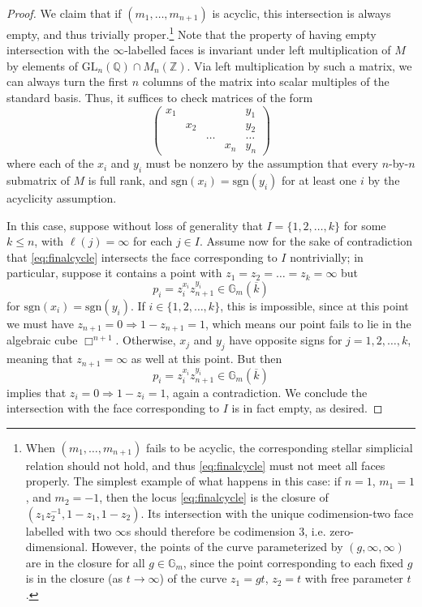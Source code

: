 \documentclass[10pt]{amsart}
\theoremstyle{definition}
\newcommand{\sgn}{\mathrm{sgn}}
\numberwithin{equation}{section}
\begin{document}
\begin{proof}
        We claim that if $(m_1,\ldots, m_{n+1})$ is acyclic, this intersection is always empty, and thus trivially proper.\footnote{When $(m_1,\ldots, m_{n+1})$ fails to be acyclic, the corresponding stellar simplicial relation should not hold, and thus \eqref{eq:finalcycle} must not meet all faces properly. The simplest example of what happens in this case: if $n=1$, $m_1=1$, and $m_2=-1$, then the locus \eqref{eq:finalcycle} is the closure of $(z_1z_2^{-1},1-z_1,1-z_2)$. Its intersection with the unique codimension-two face labelled with two $\infty$s should therefore be codimension $3$, i.e. zero-dimensional. However, the points of the curve parameterized by $(g,\infty,\infty)$ are in the closure for all $g\in \mathbb{G}_m$, since the point corresponding to each fixed $g$ is in the closure (as $t\to \infty$) of the curve $z_1=gt$, $z_2=t$ with free parameter $t$.} Note that the property of having empty intersection with the $\infty$-labelled faces is invariant under left multiplication of $M$ by elements of $\mathrm{GL}_n(\mathbb{Q})\cap M_n(\mathbb{Z})$. Via left multiplication by such a matrix, we can always turn the first $n$ columns of the matrix into scalar multiples of the standard basis. Thus, it suffices to check matrices of the form
        \[
        \begin{pmatrix}
        x_1 &  & & & y_1 \\
            & x_2    &  & & y_2 \\
            &      & \ldots &  & \ldots \\
            &        & & x_n   & y_n
        \end{pmatrix}
        \]
        where each of the $x_i$ and $y_i$ must be nonzero by the assumption that every $n$-by-$n$ submatrix of $M$ is full rank, and $\sgn(x_i)=\sgn(y_i)$ for at least one $i$ by the acyclicity assumption.

        In this case, suppose without loss of generality that $I=\{1,2,\ldots, k\}$ for some $k\le n$, with $\ell(j)=\infty$ for each $j\in I$. Assume now for the sake of contradiction that \eqref{eq:finalcycle} intersects the face corresponding to $I$ nontrivially; in particular, suppose it contains a point with $z_1=z_2=\ldots=z_k=\infty$ but 
        \[
        p_i=z_i^{x_i}z_{n+1}^{y_i} \in \mathbb{G}_m(\overline{k})
        \]
        for $\sgn(x_i)=\sgn(y_i)$. If $i\in \{1,2,\ldots, k\}$, this is impossible, since at this point we must have $z_{n+1}=0\Rightarrow 1-z_{n+1}=1$, which means our point fails to lie in the algebraic cube $\Box^{n+1}$. Otherwise, $x_j$ and $y_j$ have opposite signs for $j=1,2,\ldots, k$, meaning that $z_{n+1}=\infty$ as well at this point. But then
        \[
        p_i=z_i^{x_i}z_{n+1}^{y_i} \in \mathbb{G}_m(\overline{k})
        \]
        implies that $z_i=0\Rightarrow 1-z_{i}=1$, again a contradiction. We conclude the intersection with the face corresponding to $I$ is in fact empty, as desired.


\end{proof}
\end{document}
